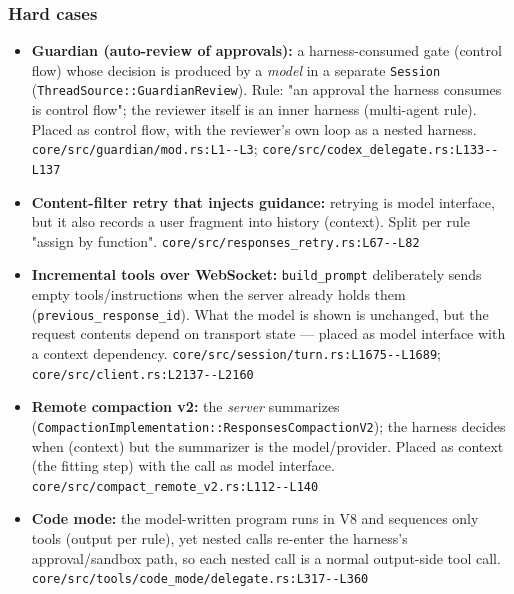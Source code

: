 \subsubsection*{Hard cases}
\begin{itemize}
\item \textbf{Guardian (auto-review of approvals):} a harness-consumed gate (control flow) whose decision is produced by a \emph{model} in a separate \texttt{Session} (\texttt{ThreadSource:\allowbreak{}:\allowbreak{}GuardianReview}). Rule: "an approval the harness consumes is control flow"; the reviewer itself is an inner harness (multi-agent rule). Placed as control flow, with the reviewer's own loop as a nested harness. \texttt{core/\allowbreak{}src/\allowbreak{}guardian/\allowbreak{}mod.\allowbreak{}rs:\allowbreak{}L1-\allowbreak{}-\allowbreak{}L3}; \texttt{core/\allowbreak{}src/\allowbreak{}codex\_\allowbreak{}delegate.\allowbreak{}rs:\allowbreak{}L133-\allowbreak{}-\allowbreak{}L137}
\item \textbf{Content-filter retry that injects guidance:} retrying is model interface, but it also records a user fragment into history (context). Split per rule "assign by function". \texttt{core/\allowbreak{}src/\allowbreak{}responses\_\allowbreak{}retry.\allowbreak{}rs:\allowbreak{}L67-\allowbreak{}-\allowbreak{}L82}
\item \textbf{Incremental tools over WebSocket:} \texttt{build\_\allowbreak{}prompt} deliberately sends empty tools/instructions when the server already holds them (\texttt{previous\_\allowbreak{}response\_\allowbreak{}id}). What the model is shown is unchanged, but the request contents depend on transport state --- placed as model interface with a context dependency. \texttt{core/\allowbreak{}src/\allowbreak{}session/\allowbreak{}turn.\allowbreak{}rs:\allowbreak{}L1675-\allowbreak{}-\allowbreak{}L1689}; \texttt{core/\allowbreak{}src/\allowbreak{}client.\allowbreak{}rs:\allowbreak{}L2137-\allowbreak{}-\allowbreak{}L2160}
\item \textbf{Remote compaction v2:} the \emph{server} summarizes (\texttt{CompactionImplementation:\allowbreak{}:\allowbreak{}ResponsesCompactionV2}); the harness decides when (context) but the summarizer is the model/provider. Placed as context (the fitting step) with the call as model interface. \texttt{core/\allowbreak{}src/\allowbreak{}compact\_\allowbreak{}remote\_\allowbreak{}v2.\allowbreak{}rs:\allowbreak{}L112-\allowbreak{}-\allowbreak{}L140}
\item \textbf{Code mode:} the model-written program runs in V8 and sequences only tools (output per rule), yet nested calls re-enter the harness's approval/sandbox path, so each nested call is a normal output-side tool call. \texttt{core/\allowbreak{}src/\allowbreak{}tools/\allowbreak{}code\_\allowbreak{}mode/\allowbreak{}delegate.\allowbreak{}rs:\allowbreak{}L317-\allowbreak{}-\allowbreak{}L360}

\end{itemize}
